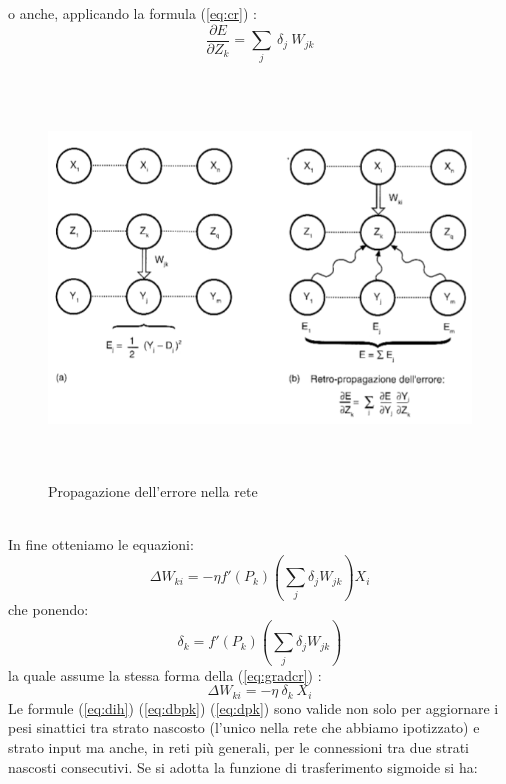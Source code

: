 \documentclass[10pt,a4paper]{article}
\begin{document}
o anche, applicando la formula (\ref{eq:cr}) :
\begin{equation}
\frac{\partial E}{\partial Z_k} = \sum_j \ \delta_j \ W_{jk}
\end{equation}
\begin{figure}[h!]
  	\centering
    \includegraphics[height=300pt]{PropagationGraph.png}
    \captionsetup{justification=centering}
    \caption*{Propagazione dell'errore nella rete}
  \label{fig:graph7}
\end{figure}
\\
In fine otteniamo le equazioni:
\begin{equation} \label{eq:dih}
\Delta W_{ki} = -\eta f'(P_k)(\sum_j \delta_j W_{jk})X_i
\end{equation}
che ponendo:
\begin{equation} \label{eq:dbpk}
\delta_k = f'(P_k)(\sum_j \delta_j W_{jk})
\end{equation}
la quale assume la stessa forma della (\ref{eq:gradcr}) :
\begin{equation} \label{eq:dpk}
\Delta W_{ki} = -\eta \ \delta_k \ X_i
\end{equation}
Le formule (\ref{eq:dih}) (\ref{eq:dbpk}) (\ref{eq:dpk}) sono valide non solo per aggiornare i pesi sinattici tra strato nascosto (l’unico nella rete che abbiamo ipotizzato) e strato input ma anche, in reti più generali, per le connessioni tra due strati nascosti consecutivi.
Se si adotta la funzione di trasferimento sigmoide si ha:
\end{document}

